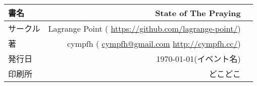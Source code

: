 \begin{titlepage}

    \vspace*{\fill}

    \begin{tabular}{lrr} \toprule
        書名 & State of The Praying \\ \midrule
        サークル & Lagrange Point ({🌐} \url{https://github.com/lagrange-point/}) \\ \midrule
        著 & cympfh
        ({📧} \url{cympfh@gmail.com} {🌐} \url{http://cympfh.cc/}) \\ \midrule
        発行日 & \today (イベント名) \\ \midrule
        印刷所 & どこどこ \\ \bottomrule
    \end{tabular}

    \thispagestyle{empty}
\end{titlepage}
